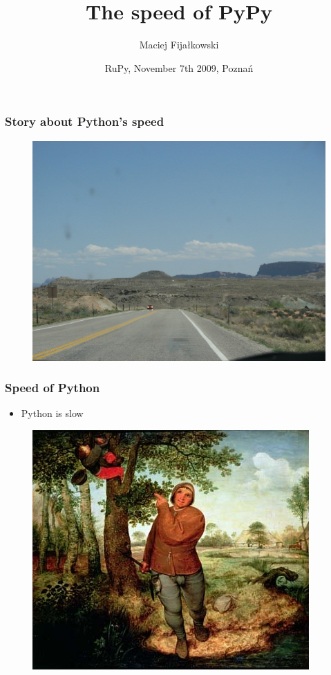 \documentclass[utf8x]{beamer}
\title{The speed of PyPy}
\author{Maciej Fijałkowski}
\institute[merlinux GmbH]
{ merlinux GmbH }
\date{RuPy, November 7th 2009, Poznań}
\begin{document}
\begin{frame}
  \titlepage
\end{frame}

\begin{frame}

  \frametitle{Story about Python's speed}
  \begin{figure}
    \includegraphics[width=.8\textwidth]{img1.jpg}
  \end{figure}

\end{frame}

\begin{frame}
  \frametitle{Speed of Python}
  \begin{itemize}
     \item Python is slow
  \end{itemize}
  \pause
  \begin{figure}
    \includegraphics[width=.6\textwidth]{peasant_and_birdnester-400.jpg}
  \end{figure}
  
\end{frame}
\end{document}
